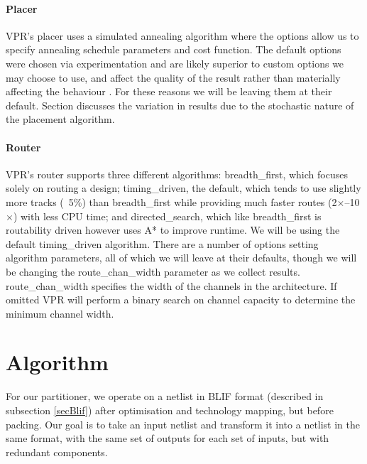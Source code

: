 \documentclass[12pt,final,oneside]{dwThesis} %
\begin{document}
   \subsubsection{Placer}
   \ac{VPR}'s placer uses a simulated annealing algorithm where the options allow us to specify annealing schedule parameters and cost function. The default options were chosen via experimentation and are likely superior to custom options we may choose to use, and affect the quality of the result rather than materially affecting the behaviour \cite{VPRManual, VPRBook}. For these reasons we will be leaving them at their default.
   Section  discusses the variation in results due to the stochastic nature of the placement algorithm.
   \subsubsection{Router}
   \ac{VPR}'s router supports three different algorithms: breadth\_first, which focuses solely on routing a design; timing\_driven, the default, which tends to use slightly more tracks (~5\%) than breadth\_first while providing much faster routes (2$\times$--10$\times$) with less CPU time; and directed\_search, which like breadth\_first is routability driven however uses A* to improve runtime. We will be using the default timing\_driven algorithm.
   There are a number of options setting algorithm parameters, all of which we will leave at their defaults, though we will be changing the route\_chan\_width parameter as we collect results. route\_chan\_width specifies the width of the channels in the architecture. If omitted \ac{VPR} will perform a binary search on channel capacity to determine the minimum channel width.


   \chapter{Algorithm}
   For our partitioner, we operate on a netlist in \ac{BLIF} format (described in subsection \ref{secBlif}) after optimisation and technology mapping, but before packing. Our goal is to take an input netlist and transform it into a netlist in the same format, with the same set of outputs for each set of inputs, but with redundant components.
\end{document}
